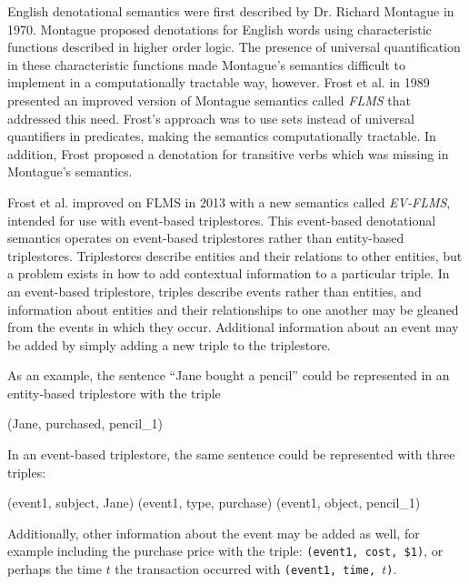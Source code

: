 \documentclass[../main.tex]{subfiles}
\begin{document}
English denotational semantics were first described by Dr. Richard Montague in 1970\cite{dowty2012introduction}.  Montague proposed
denotations for English words using characteristic functions described in higher order logic.
The presence of universal quantification in these characteristic functions made Montague's semantics difficult to implement in a computationally tractable way, however.
Frost et al. in 1989 presented an improved version of Montague semantics called {\em FLMS}\cite{frost1989constructing} that addressed this need.  Frost's approach was to use sets instead of universal quantifiers in predicates, making the semantics computationally tractable.  In addition, Frost proposed a denotation for transitive verbs which was missing in Montague's semantics\cite{frost2013event}.

Frost et al. improved on FLMS in 2013 with a new semantics called {\em EV-FLMS}\cite{frost2013event}, intended for use with event-based triplestores.
This event-based denotational semantics operates on event-based triplestores\cite{frost2014demonstration} rather than entity-based triplestores.  Triplestores describe entities and their relations to other entities, but a problem exists in how to add contextual information to a particular triple.  In an event-based triplestore, triples describe events rather than entities, and information about entities and their relationships to one another may be gleaned from the events in which they occur.  Additional information about an event may be added by simply adding a new triple to the triplestore.

As an example, the sentence ``Jane bought a pencil'' could be represented in an entity-based triplestore with the triple


\begin{code}
	(Jane, purchased, pencil_1)
\end{code}

In an event-based triplestore, the same sentence could be represented with three triples:

\begin{code}
	(event1, subject, Jane)
	(event1, type, purchase)
	(event1, object, pencil_1)
\end{code}
	
Additionally, other information about the event may be added as well, for example including the purchase price with the triple: \texttt{(event1, cost, \$1)}, or perhaps the time $t$ the transaction occurred with \texttt{(event1, time, $t$)}.
\end{document}
